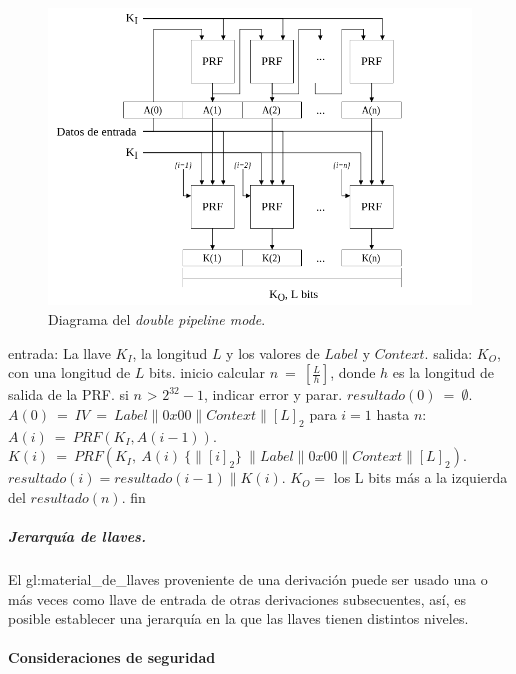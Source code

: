 \begin{figure}[H]
  \begin{center}
    \includegraphics[width=0.75\linewidth]{diagramas/dpipeline_mode}
    \caption{Diagrama del \textit{double pipeline mode}.}
    \label{diagrama_dpipeline_mode}
   \end{center}
\end{figure}

\begin{pseudocodigo}[caption={Funcionamiento del \textit{double pipeline mode}.}, 
label={mi:3}]
  entrada:   La llave $K_I$, la longitud $L$ y los valores de $Label$ y $Context$.
  salida:    $K_O$, con una longitud de $L$ bits.
  inicio
    calcular $n\: =\: [\frac{L}{h}]$, donde $h$ es la longitud de salida de la PRF.
    si $n$ > $2^{32}-1$, indicar error y parar.
    $resultado(0)\: =\: \emptyset$.
    $A(0)\: =\: IV\: =\: Label \parallel 0x00 \parallel Context \parallel {[L]}_2$
    para $i=1$ hasta $n$:
      $A(i)\: =\: PRF(K_I, A(i-1))$.
      $K(i)\: =\: PRF(K_I,\: A(i)\: \{\parallel {[i]}_2\}\: \parallel Label \parallel 0x00 \parallel Context \parallel {[L]}_2)$.
      $resultado(i) = resultado(i-1) \parallel K(i)$.
    $K_O =$ los L bits más a la izquierda del $resultado(n)$. 
  fin
\end{pseudocodigo}

\subparagraph{Jerarquía de llaves.}
El \gls{gl:material_de_llaves} proveniente de una derivación puede ser usado 
una o más veces como llave de entrada de otras derivaciones subsecuentes, así, 
es posible establecer una jerarquía en la que las llaves tienen distintos 
niveles.

\paragraph{Consideraciones de seguridad}

